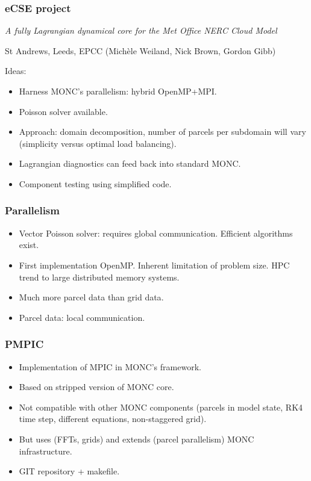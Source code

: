 \documentclass{beamer}
\def\oran#1{\color{orange} #1}
\def\gr#1{\color{dark_green} #1}
\def\re#1{\color{red}   #1}
\def\bl#1{\color{blue}  #1}
\def\pu#1{\color{purple} #1}
\begin{document}
\begin{frame}
\frametitle{eCSE project}
\textit{A fully Lagrangian dynamical core for the Met Office NERC Cloud Model}
\vspace{0.2cm}
\begin{center}
St Andrews, Leeds, EPCC (Mich\`ele Weiland, Nick Brown, Gordon Gibb)
\end{center}

\vspace{0.1cm}
Ideas:
\begin{itemize}
\item Harness {\gr MONC's parallelism}: hybrid OpenMP+MPI.
\item Poisson solver available.
\item Approach: {\bl domain decomposition}, number of parcels per subdomain will vary (simplicity versus optimal load balancing).
\item {\re Lagrangian diagnostics} can feed back into standard MONC.
\item {\pu Component testing} using simplified code.
\end{itemize}

\end{frame}

\begin{frame}
\frametitle{Parallelism}

\vspace{0.2cm}
\begin{itemize}
\item Vector Poisson solver: requires global communication. {\bl Efficient algorithms} exist.
\item First implementation OpenMP. Inherent limitation of problem size. HPC trend to {\pu large distributed memory systems}. 
\item Much more {\re parcel data} than {\gr grid data}.
\item Parcel data: {\oran local communication}.
\end{itemize}

\centering

\end{frame}

\begin{frame}
\frametitle{PMPIC}
\begin{itemize}
\item Implementation of MPIC in MONC's framework.
\item Based on stripped version of MONC core.
\item Not compatible with other MONC components (parcels in model state, RK4 time step, different equations, non-staggered grid).
\item But uses (FFTs, grids) and extends (parcel parallelism) MONC infrastructure.
\item GIT repository + makefile.
\end{itemize}
\end{frame}
\end{document}
